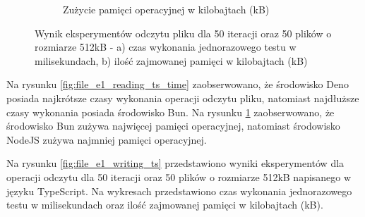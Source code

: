 \begin{figure}[H]
\begin{subfigure}[b]{0.42\textwidth}
    \caption{Zużycie pamięci operacyjnej w kilobajtach (kB)}
    \label{fig:file_e1_reading_ts_memory}
  \end{subfigure}
  \caption{Wynik eksperymentów odczytu pliku dla 50 iteracji oraz 50 plików o rozmiarze 512kB - a) czas wykonania jednorazowego testu w milisekundach, b) ilość zajmowanej pamięci w kilobajtach (kB)}
  \label{fig:file_e1_reading_ts}
\end{figure}

Na rysunku \ref{fig:file_e1_reading_ts_time} zaobserwowano, że środowisko Deno posiada najkrótsze czasy wykonania operacji odczytu pliku, natomiast najdłuższe czasy wykonania posiada środowisko Bun. Na rysunku \ref{fig:file_e1_reading_ts_memory} zaobserwowano, że środowisko Bun zużywa najwięcej pamięci operacyjnej, natomiast środowisko NodeJS zużywa najmniej pamięci operacyjnej.

Na rysunku \ref{fig:file_e1_writing_ts} przedstawiono wyniki eksperymentów dla operacji odczytu dla 50 iteracji oraz 50 plików o rozmiarze 512kB napisanego w języku TypeScript. Na wykresach przedstawiono czas wykonania jednorazowego testu w milisekundach oraz ilość zajmowanej pamięci w kilobajtach (kB).

